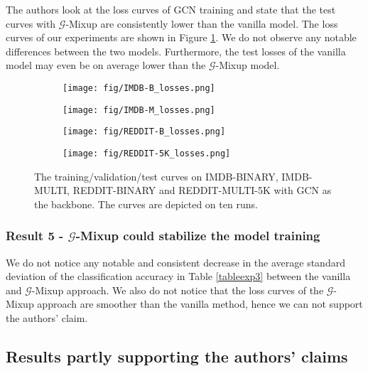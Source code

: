 The authors look at the loss curves of GCN training and state that the test curves with $\mathcal{G}$-Mixup are consistently lower than the vanilla model. The loss curves of our experiments are shown in Figure \ref{testexp4}. We do not observe any notable differences between the two models. Furthermore, the test losses of the vanilla model may even be on average lower than the $\mathcal{G}$-Mixup model.

\begin{figure}
\centering
\begin{subfigure}{.25\textwidth}
  \centering
  \texttt{[image: fig/IMDB-B\_losses.png]}
\end{subfigure}%
\begin{subfigure}{.25\textwidth}
  \centering
  \texttt{[image: fig/IMDB-M\_losses.png]}
  \end{subfigure}%
  \begin{subfigure}{.25\textwidth}
  \centering
  \texttt{[image: fig/REDDIT-B\_losses.png]}
\end{subfigure}%
\begin{subfigure}{.25\textwidth}
  \centering
  \texttt{[image: fig/REDDIT-5K\_losses.png]}
\end{subfigure}
\caption{The training/validation/test curves on IMDB-BINARY, IMDB-MULTI, REDDIT-BINARY and REDDIT-MULTI-5K with GCN as the backbone. The curves are depicted on ten runs.}
\label{testexp4}
\end{figure}

\subsubsection{Result 5 - $\mathcal{G}$-Mixup could stabilize the model training}

We do not notice any notable and consistent decrease in the average standard deviation of the classification accuracy in Table \ref{tableexp3} between the vanilla and $\mathcal{G}$-Mixup approach. We also do not notice that the loss curves of the $\mathcal{G}$-Mixup approach are smoother than the vanilla method, hence we can not support the authors' claim.


\subsection{Results partly supporting the authors' claims}
